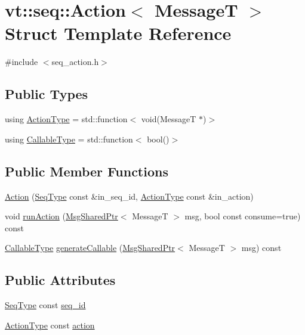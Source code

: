 \hypertarget{structvt_1_1seq_1_1_action}{}\section{vt\+:\+:seq\+:\+:Action$<$ MessageT $>$ Struct Template Reference}
\label{structvt_1_1seq_1_1_action}


{\ttfamily \#include $<$seq\+\_\+action.\+h$>$}

\subsection*{Public Types}
\begin{DoxyCompactItemize}
\item 
using \hyperlink{structvt_1_1seq_1_1_action_ae38fc2cf91f5654f548ea386ee603963}{Action\+Type} = std\+::function$<$ void(MessageT $\ast$)$>$
\item 
using \hyperlink{structvt_1_1seq_1_1_action_a6c683ecf97baa16ca6432b6773aa8f89}{Callable\+Type} = std\+::function$<$ bool()$>$
\end{DoxyCompactItemize}
\subsection*{Public Member Functions}
\begin{DoxyCompactItemize}
\item 
\hyperlink{structvt_1_1seq_1_1_action_a054bffc215a985f7b3114ff877d980ba}{Action} (\hyperlink{namespacevt_1_1seq_a3b612da217ac669d39c159f134ab8434}{Seq\+Type} const \&in\+\_\+seq\+\_\+id, \hyperlink{structvt_1_1seq_1_1_action_ae38fc2cf91f5654f548ea386ee603963}{Action\+Type} const \&in\+\_\+action)
\item 
void \hyperlink{structvt_1_1seq_1_1_action_aeed40bb2f54409d70596c33ad92b8fd4}{run\+Action} (\hyperlink{namespacevt_ab2b3d506ec8e8d1540aede826d84a239}{Msg\+Shared\+Ptr}$<$ MessageT $>$ msg, bool const consume=true) const
\item 
\hyperlink{structvt_1_1seq_1_1_action_a6c683ecf97baa16ca6432b6773aa8f89}{Callable\+Type} \hyperlink{structvt_1_1seq_1_1_action_ae1a2087109fa13a4f77d8ad8ce534fe0}{generate\+Callable} (\hyperlink{namespacevt_ab2b3d506ec8e8d1540aede826d84a239}{Msg\+Shared\+Ptr}$<$ MessageT $>$ msg) const
\end{DoxyCompactItemize}
\subsection*{Public Attributes}
\begin{DoxyCompactItemize}
\item 
\hyperlink{namespacevt_1_1seq_a3b612da217ac669d39c159f134ab8434}{Seq\+Type} const \hyperlink{structvt_1_1seq_1_1_action_a3c0bb8676960fc1dff403f2a17ac4e3e}{seq\+\_\+id}
\item 
\hyperlink{structvt_1_1seq_1_1_action_ae38fc2cf91f5654f548ea386ee603963}{Action\+Type} const \hyperlink{structvt_1_1seq_1_1_action_aff78400db5a8a2ba0faaa80acb90ec78}{action}
\end{DoxyCompactItemize}



